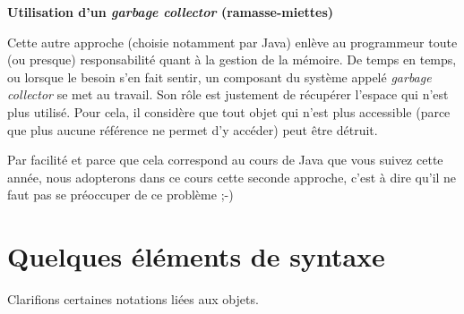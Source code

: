 {\sffamily\bfseries\upshape
Utilisation d’un \textit{garbage collector} (ramasse-miettes)}

Cette autre approche (choisie notamment par Java) enlève au programmeur
toute (ou presque) responsabilité quant à la gestion de la mémoire. De
temps en temps, ou lorsque le besoin s’en fait sentir, un composant du
système appelé \textit{garbage collector} se met au travail. Son rôle
est justement de récupérer l’espace qui n’est plus utilisé. Pour cela,
il considère que tout objet qui n'est plus accessible
(parce que plus aucune référence ne permet d’y accéder) peut être
détruit.

Par facilité et parce que cela correspond au cours de Java que vous
suivez cette année, nous adopterons dans ce cours cette seconde
approche, c'est à dire qu'il ne faut
pas se préoccuper de ce problème ;-)


\section{Quelques éléments de syntaxe}

Clarifions certaines notations liées aux objets.

